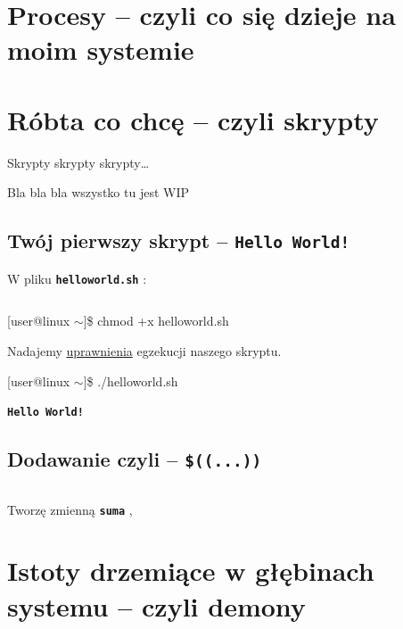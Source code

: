 \documentclass[12pt]{article}
\makeatletter
\newcommand{\ttbf}[1]{
    \texttt{\textbf{#1}}
}
\newenvironment{console1}
{
    \ttfamily
    \fontseries{b}
    \selectfont
    {[}user@linux $\sim${]}\$} {

}
\makeatother
\begin{document}
\section{Procesy -- czyli co się dzieje na moim systemie}
\label{sec:process}

\section{Róbta co chcę -- czyli skrypty}

Skrypty skrypty skrypty\dots

Bla bla bla wszystko tu jest WIP

\subsection{Twój pierwszy skrypt -- \ttbf{Hello World!}}

W pliku \ttbf{helloworld.sh}:

\begin{minipage}[t]{0.5\textwidth}
\inputminted{bash}{skrypty/helloworld.sh}
\end{minipage}

\begin{minipage}[t]{0.55\textwidth}
\begin{console1}
    chmod +x helloworld.sh
\end{console1}
\end{minipage}\hfill
\begin{minipage}[t]{0.45\textwidth}
    Nadajemy \hyperref[sec:perms]{uprawnienia} egzekucji naszego skryptu.
\end{minipage}

\begin{console1}
    ./helloworld.sh
\end{console1}

\ttbf{Hello World!}

\subsection{Dodawanie czyli -- \ttbf{\$((...))}}

\begin{minipage}[t]{0.49\textwidth}
    \inputminted{bash}{skrypty/dodawanie.sh}
\end{minipage}\hfill
\begin{minipage}[t]{0.45\textwidth}
    Tworzę zmienną \ttbf{suma},

\end{minipage}

\section{Istoty drzemiące w głębinach systemu -- czyli demony}
\end{document}
